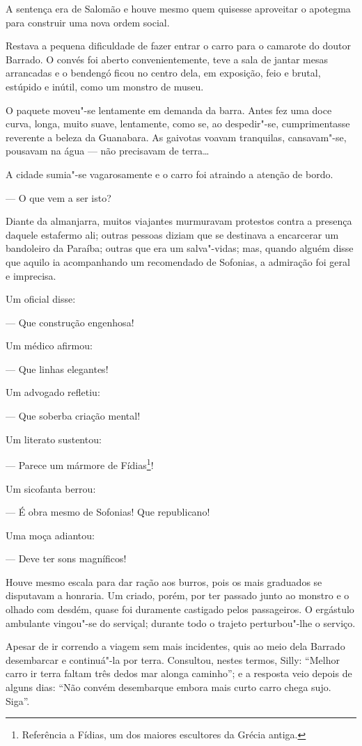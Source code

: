 A sentença era de Salomão e houve mesmo quem quisesse aproveitar o
apotegma para construir uma nova ordem social.

Restava a pequena dificuldade de fazer entrar o carro para o camarote do
doutor Barrado. O convés foi aberto convenientemente, teve a sala de
jantar mesas arrancadas e o bendengó ficou no centro dela, em exposição,
feio e brutal, estúpido e inútil, como um monstro de museu.

O paquete moveu"-se lentamente em demanda da barra. Antes fez uma doce
curva, longa, muito suave, lentamente, como se, ao despedir"-se,
cumprimentasse reverente a beleza da Guanabara. As gaivotas voavam
tranquilas, cansavam"-se, pousavam na água --- não precisavam de terra\ldots{}

A cidade sumia"-se vagarosamente e o carro foi atraindo a atenção de
bordo.

--- O que vem a ser isto?

Diante da almanjarra, muitos viajantes murmuravam protestos contra a
presença daquele estafermo ali; outras pessoas diziam que se destinava a
encarcerar um bandoleiro da Paraíba; outras que era um salva"-vidas; mas,
quando alguém disse que aquilo ia acompanhando um recomendado de
Sofonias, a admiração foi geral e imprecisa.

Um oficial disse:

--- Que construção engenhosa!

Um médico afirmou:

--- Que linhas elegantes!

Um advogado refletiu:

--- Que soberba criação mental!

Um literato sustentou:

--- Parece um mármore de Fídias\footnote{Referência a Fídias, um dos
  maiores escultores da Grécia antiga.}!

Um sicofanta berrou:

--- É obra mesmo de Sofonias! Que republicano!

Uma moça adiantou:

--- Deve ter sons magníficos!

Houve mesmo escala para dar ração aos burros, pois os mais graduados se
disputavam a honraria. Um criado, porém, por ter passado junto ao
monstro e o olhado com desdém, quase foi duramente castigado pelos
passageiros. O ergástulo ambulante vingou"-se do serviçal; durante todo o
trajeto perturbou"-lhe o serviço.

Apesar de ir correndo a viagem sem mais incidentes, quis ao meio dela
Barrado desembarcar e continuá"-la por terra. Consultou, nestes termos,
Silly: ``Melhor carro ir terra faltam três dedos mar alonga caminho''; e
a resposta veio depois de alguns dias: ``Não convém desembarque embora
mais curto carro chega sujo. Siga''.

